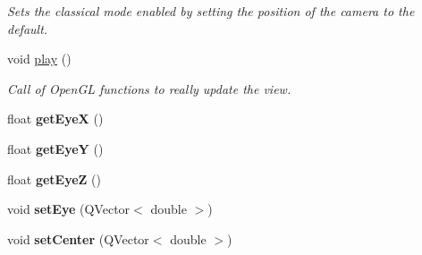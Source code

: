 \begin{DoxyCompactItemize}
\begin{DoxyCompactList}\small\item\em Sets the classical mode enabled by setting the position of the camera to the default. \end{DoxyCompactList}\item 
\hypertarget{class_c_camera_af00e6545d555de2240912e7bf5bb3dc5}{void \hyperlink{class_c_camera_af00e6545d555de2240912e7bf5bb3dc5}{play} ()}\label{class_c_camera_af00e6545d555de2240912e7bf5bb3dc5}

\begin{DoxyCompactList}\small\item\em Call of Open\-G\-L functions to really update the view. \end{DoxyCompactList}\item 
\hypertarget{class_c_camera_a123f0456766072584d80ec1ea4e6cf43}{float {\bfseries get\-Eye\-X} ()}\label{class_c_camera_a123f0456766072584d80ec1ea4e6cf43}

\item 
\hypertarget{class_c_camera_a0fa71f3a5258a6a0eef4bf0a4f4bc180}{float {\bfseries get\-Eye\-Y} ()}\label{class_c_camera_a0fa71f3a5258a6a0eef4bf0a4f4bc180}

\item 
\hypertarget{class_c_camera_a2d8e4d885998a0f3dee718f3dcc9592d}{float {\bfseries get\-Eye\-Z} ()}\label{class_c_camera_a2d8e4d885998a0f3dee718f3dcc9592d}

\item 
\hypertarget{class_c_camera_ac24d77888afef520745dcd774eb5dfc8}{void {\bfseries set\-Eye} (Q\-Vector$<$ double $>$)}\label{class_c_camera_ac24d77888afef520745dcd774eb5dfc8}

\item 
\hypertarget{class_c_camera_abd924c4d472396715d885e123780b69f}{void {\bfseries set\-Center} (Q\-Vector$<$ double $>$)}\label{class_c_camera_abd924c4d472396715d885e123780b69f}

\end{DoxyCompactItemize}



